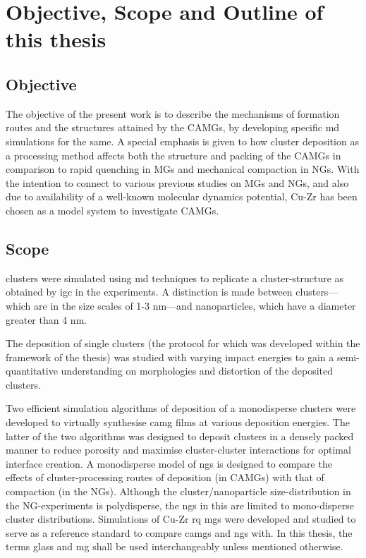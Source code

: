 \section{Objective, Scope and Outline of this thesis}
\subsection{Objective}

The objective of the present work is to describe the mechanisms of formation routes and the structures attained by the CAMGs, by developing specific \gls{md} simulations for the same. A special emphasis is given to how cluster deposition as a processing method affects both the structure and packing of the CAMGs in comparison to rapid quenching in MGs and mechanical compaction in NGs. With the intention to connect to various previous studies on MGs and NGs, and also due to availability of a well-known molecular dynamics potential, Cu-Zr has been chosen as a model system to investigate CAMGs.  \par

\subsection{Scope}
\cz clusters were simulated using \gls{md} techniques to replicate a cluster-structure as obtained by \gls{igc} in the experiments. A distinction is made between clusters---which are in the size scales of 1-3 nm---and nanoparticles, which have a diameter greater than 4 nm.

The deposition of single \cz clusters (the protocol for which was developed within the framework of the thesis) was studied with varying impact energies to gain a semi-quantitative understanding on morphologies and distortion of the deposited clusters. \par

Two efficient simulation algorithms of deposition of a monodisperse clusters were developed to virtually synthesise \gls{camg} films at various deposition energies. The latter of the two algorithms was designed to deposit clusters in 
a densely packed manner to reduce porosity and maximise cluster-cluster interactions for optimal interface creation. A monodisperse model of \gls{ng}s is designed to compare the effects of cluster-processing routes of deposition 
(in CAMGs) with that of compaction (in the NGs). Although the cluster/nanoparticle size-distribution in the NG-experiments is polydisperse, the \gls{ng}s in this are limited to mono-disperse cluster distributions. Simulations of Cu-Zr \gls{rq} \gls{mg}s were developed and studied to serve as a reference standard to compare \gls{camg}s and \gls{ng}s with. In this thesis, the terms glass and \gls{mg} shall be used interchangeably unless mentioned otherwise. \par

